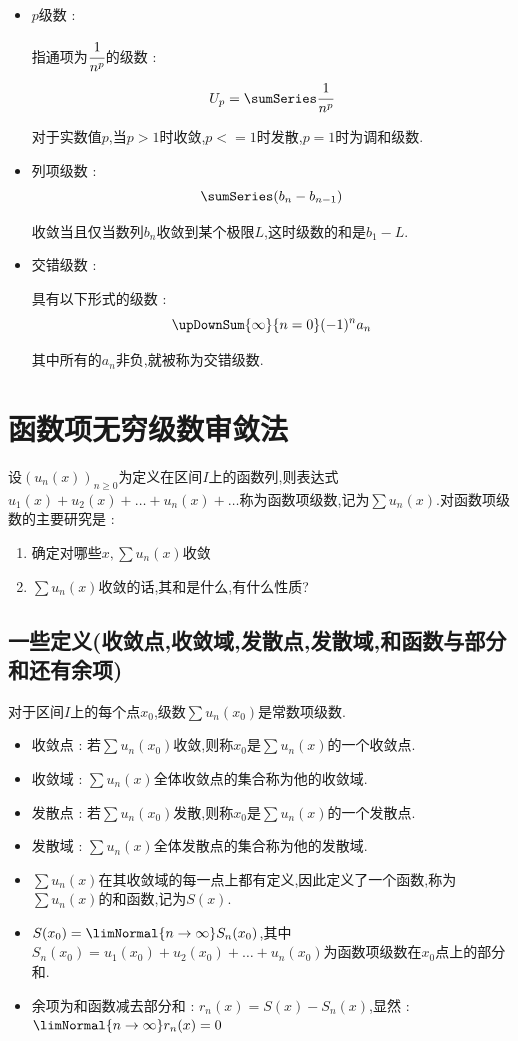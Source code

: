 {{{{\begin{itemize}
{            他是发散的.
            }
      \item{
            $p$级数 :

            指通项为$\cfrac{1}{n^p}$的级数 :
            $$
              U_p = \sumSeries\cfrac{1}{n^p}
            $$

            对于实数值$p$,当$p > 1$时收敛,$p <= 1$时发散,$p = 1$时为调和级数.
            }
      \item{
            列项级数 :
            $$
              \sumSeries(b_n - b_{n - 1})
            $$

            收敛当且仅当数列$b_n$收敛到某个极限$L$,这时级数的和是$b_1 - L$.
            }
      \item{
            交错级数 :

            具有以下形式的级数 :
            $$
              \upDownSum{\infty}{n = 0}(-1)^na_n
            $$

            其中所有的$a_n$非负,就被称为交错级数.
            }
    \end{itemize}

  }%

 }%

\section{函数项无穷级数审敛法}{
设$(u_n(x))_{n \geq 0}$为定义在区间$I$上的函数列,则表达式$u_1(x) + u_2(x) + \dots + u_n(x) + \dots$称为函数项级数,记为$\sum u_n(x)$.对函数项级数的主要研究是 :
\begin{enumerate}
  \item 确定对哪些$x,\sum u_n(x)$收敛
  \item $\sum u_n(x)$收敛的话,其和是什么,有什么性质?
\end{enumerate}

\subsection{一些定义(收敛点,收敛域,发散点,发散域,和函数与部分和还有余项)}{
  对于区间$I$上的每个点$x_0$,级数$\sum u_n(x_0)$是常数项级数.
  \begin{itemize}
    \item 收敛点 : 若$\sum u_n(x_0)$收敛,则称$x_0$是$\sum u_n(x)$的一个收敛点.
    \item 收敛域 : $\sum u_n(x)$全体收敛点的集合称为他的收敛域.
    \item 发散点 : 若$\sum u_n(x_0)$发散,则称$x_0$是$\sum u_n(x)$的一个发散点.
    \item 发散域 : $\sum u_n(x)$全体发散点的集合称为他的发散域.
    \item $\sum u_n(x)$在其收敛域的每一点上都有定义,因此定义了一个函数,称为$\sum u_n(x)$的和函数,记为$S(x)$.
    \item $S(x_0) = \limNormal{n \to \infty}S_n(x_0)$,其中$S_n(x_0) = u_1(x_0) + u_2(x_0) + \dots + u_n(x_0)$为函数项级数在$x_0$点上的部分和.
    \item 余项为和函数减去部分和 : $r_n(x) = S(x) - S_n(x)$,显然 : $\limNormal{n \to \infty} r_n(x) = 0$
  \end{itemize}
}%

}}}
